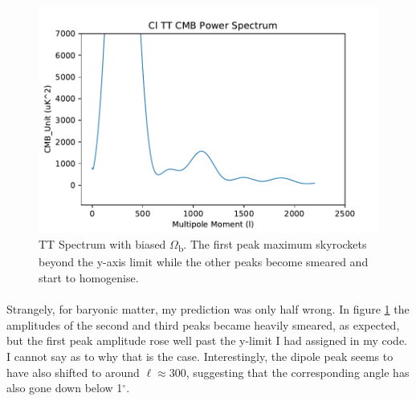 \documentclass[twoside, fontsize=12pt,
     bibliography=totoc, %
     listof=totoc, %
     index=totoc, %
     onehalfspacing %
]{_MScDiss2017_cls}
\begin{document}
\begin{figure}[t]
	\begin{center}
	\includegraphics{3Cl-TT-vs-l}
	\caption{TT Spectrum with biased $\Omega$\textsubscript{b}. The first peak maximum skyrockets beyond the y-axis limit while the other peaks become smeared and start to homogenise.}
	\label{fig:bbias}
	\end{center}
\end{figure}

\paragraph{}

Strangely, for baryonic matter, my prediction was only half wrong. In figure \ref{fig:bbias} the amplitudes of the second and third peaks became heavily smeared, as expected, but the first peak amplitude rose well past the y-limit I had assigned in my code. I cannot say as to why that is the case. Interestingly, the dipole peak seems to have also shifted to around $\ell$$\approx$300, suggesting that the corresponding angle has also gone down below 1$^\circ$.

\paragraph{}
\end{document}
